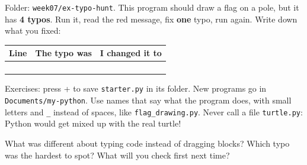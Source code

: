 \begin{exercise}
Folder: \texttt{week07/ex-typo-hunt}. This program should draw a flag on a pole, but it has \textbf{4 typos}. Run it, read the red message, fix \textbf{one} typo, run again. Write down what you fixed:
\begin{center}
\renewcommand{\arraystretch}{1.6}
\begin{tabular}{@{}p{2cm}p{5cm}p{5cm}@{}}
\toprule
Line & The typo was & I changed it to\\
\midrule
 & & \\ \midrule
 & & \\ \midrule
 & & \\ \midrule
 & & \\
\bottomrule
\end{tabular}
\end{center}
\end{exercise}

\begin{tip}
Exercises: press + to save \texttt{starter.py} in its folder. New programs go in \texttt{Documents/my-python}. Use names that say what the program does, with small letters and \texttt{\_} instead of spaces, like \texttt{flag\_drawing.py}. Never call a file \texttt{turtle.py}: Python would get mixed up with the real turtle!
\end{tip}

\begin{vocab}
\end{vocab}

\begin{reflection}
What was different about typing code instead of dragging blocks?
Which typo was the hardest to spot? What will you check first next time?
\end{reflection}
